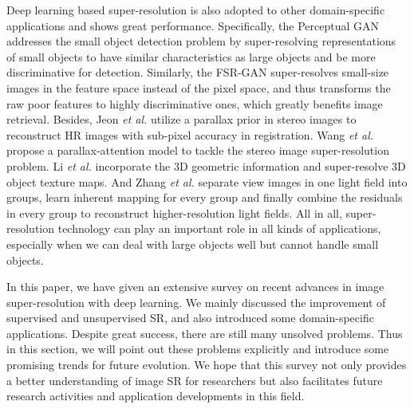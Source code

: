 {Deep learning based super-resolution is also adopted to other domain-specific applications and shows great performance.
Specifically, the Perceptual GAN  addresses the small object detection problem by super-resolving representations of small objects to have similar characteristics as large objects and be more discriminative for detection.
Similarly, the FSR-GAN  super-resolves small-size images in the feature space instead of the pixel space, and thus transforms the raw poor features to highly discriminative ones, which greatly benefits image retrieval.
Besides, Jeon \textit{et al.}  utilize a parallax prior in stereo images to reconstruct HR images with sub-pixel accuracy in registration.
Wang \textit{et al.}  propose a parallax-attention model to tackle the stereo image super-resolution problem.
Li \textit{et al.}  incorporate the 3D geometric information and super-resolve 3D object texture maps.
And Zhang \textit{et al.}  separate view images in one light field into groups, learn inherent mapping for every group and finally combine the residuals in every group to reconstruct higher-resolution light fields.
All in all, super-resolution technology can play an important role in all kinds of applications, especially when we can deal with large objects well but cannot handle small objects.

In this paper, we have given an extensive survey on recent advances in image super-resolution with deep learning.
We mainly discussed the improvement of supervised and unsupervised SR, and also introduced some domain-specific applications.
Despite great success, there are still many unsolved problems.
Thus in this section, we will point out these problems explicitly and introduce some promising trends for future evolution.
We hope that this survey not only provides a better understanding of image SR for researchers but also facilitates future research activities and application developments in this field.

}
